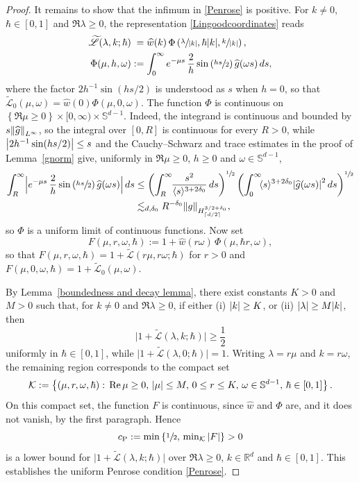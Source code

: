 \documentclass[JEP,XML,SOM,Unicode]{cedram}
\newcommand{\babs}[1]{\bigl|#1\bigr|}
\newcommand{\Babs}[1]{\Bigl|#1\Bigr|}
\theoremstyle{plain}
\theoremstyle{remark}
\newcommand{\br}[1]{\left(#1\right)}
\newcommand{\ak}{\abs{k}}
\newcommand{\jb}[1]{\langle#1\rangle}
\newcommand{\set}[1]{\left\{#1\right\}}
\newcommand{\R}{\mathbb{R}}
\newcommand{\lam}{\lambda}
\newcommand{\ceils}[1]{\lceil#1\rceil}
\begin{document}
\begin{proof}
It remains to show that the infimum in \eqref{Penrose} is positive. For $k\neq0$, $\hbar\in[0,1]$ and $\Re\lam\geq0$, the representation \eqref{Lingoodcoordinates} reads\vspace*{-3pt}
\begin{align*}
\widetilde{\mathscr L}(\lam,k;\hbar)&\hphantom{:}=\widehat w(k)\,\Phi\br{\sfrac{\lam}{\ak},\hbar\ak,\sfrac{k}{\ak}},\\
\Phi(\mu,h,\omega)&:=\int_0^\infty e^{-\mu s}\,\frac{2}{h}\sin\br{\sfrac{hs}{2}}\widehat g(\omega s)\,ds,
\end{align*}
where the factor $2h^{-1}\sin(hs/2)$ is understood as $s$ when $h=0$, so that $\widetilde{\mathscr L}_0(\mu,\omega)=\widehat w(0)\Phi(\mu,0,\omega)$. The function $\Phi$ is continuous on $\set{\Re\mu\geq0}\times[0,\infty)\times\mathbb S^{d-1}$. Indeed, the integrand is continuous and bounded by $s\norm{\widehat g}_{L^\infty}$, so the integral over $[0,R]$ is continuous for every $R>0$, while $\abs{2h^{-1}\operatorname{sin}(hs/2)}\leq s$ and the Cauchy--Schwarz and trace estimates in the proof of Lemma~\ref{gnorm} give, uniformly in $\Re\mu\geq0$, $h\geq0$ and $\omega\in\mathbb S^{d-1}$,\vspace*{-3pt}
\begin{align*}
\int_R^\infty\Babs{e^{-\mu s}\,\frac{2}{h}\sin\br{\sfrac{hs}{2}}\widehat g(\omega s)}\,ds
&\leq\br{\int_R^\infty\hspace*{-1mm}\frac{s^2}{\jb{s}^{3+2\delta_0}}\,ds}^{\sfrac{1}{2}}\br{\int_0^\infty\hspace*{-1mm}\jb{s}^{3+2\delta_0}\abs{\widehat g(\omega s)}^2\,ds}^{\sfrac{1}{2}}\\
&\lesssim_{d,\delta_0} R^{-\delta_0}\norm{g}_{H^{3/2+\delta_0}_{\ceils{d/2}}},
\end{align*}
so $\Phi$ is a uniform limit of continuous functions. Now set\vspace*{-3pt}
\[
F(\mu,r,\omega,\hbar):=1+\widehat w(r\omega)\,\Phi(\mu,\hbar r,\omega),
\]
so that $F(\mu,r,\omega,\hbar)=1+\widetilde{\mathscr L}(r\mu,r\omega;\hbar)$ for $r>0$ and $F(\mu,0,\omega,\hbar)=1+\widetilde{\mathscr L}_0(\mu,\omega)$.

By Lemma~\ref{boundedness and decay lemma}, there exist constants \( K > 0 \) and \( M > 0 \) such that, for \( k\neq0 \) and \( \Re \lam \geq 0 \), if either (i) \( \ak \geq K \), or (ii) \( \abs{\lam} \geq M\ak \), then
\[
\babs{1 + \widetilde{\mathscr L}(\lam,k;\hbar)} \geq \frac{1}{2}
\]uniformly in $\hbar\in[0,1]$, while $\babs{1 + \widetilde{\mathscr L}(\lam,0;\hbar)}=1$. Writing $\lam=r\mu$ and $k=r\omega$, the remaining region corresponds to the compact set \[
\mathcal K:=\left\{
(\mu, r, \omega, \hbar) : \,
\Re\mu\geq0,\,\abs{\mu} \leq M,\,
0\leq r \leq K,\,
\omega\in\mathbb S^{d-1},\,
\hbar \in [0,1]
\right\}.
\]
On this compact set, the function $F$ is continuous, since $\widehat w$ and $\Phi$ are, and it does not vanish, by the first paragraph. Hence
\[\textstyle
{c_{\mathrm{P}}} := \min\set{\sfrac{1}{2},\,\min_{\mathcal K}\abs{F}} > 0
\]
is a lower bound for $\babs{1 + \widetilde{\mathscr L}(\lam,k;\hbar)}$ over $\Re \lam \geq 0$, $k\in\R^d$ and $\hbar \in [0,1]$.
This establishes the uniform Penrose condition \eqref{Penrose}.
\end{proof}
\end{document}
